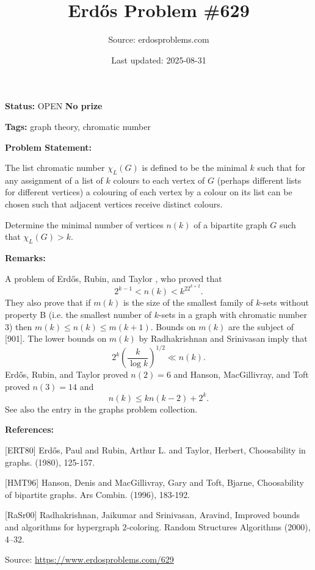 \documentclass{article}
\title{Erd\H{o}s Problem \#629}
\date{Last updated: 2025-08-31}
\author{Source: erdosproblems.com}
\begin{document}
\maketitle

\noindent\textbf{Status:} OPEN \quad \textbf{No prize}

\noindent\textbf{Tags:} graph theory, chromatic number

\medskip
\noindent\textbf{Problem Statement:}

The list chromatic number $\chi_L(G)$ is defined to be the minimal $k$ such that for any assignment of a list of $k$ colours to each vertex of $G$ (perhaps different lists for different vertices) a colouring of each vertex by a colour on its list can be chosen such that adjacent vertices receive distinct colours.

Determine the minimal number of vertices $n(k)$ of a bipartite graph $G$ such that $\chi_L(G)>k$.

\bigskip
\noindent\textbf{Remarks:}

A problem of Erd\H{o}s, Rubin, and Taylor \cite{ERT80}, who proved that\[2^{k-1}<n(k) <k^22^{k+2}.\]They also prove that if $m(k)$ is the size of the smallest family of $k$-sets without property B (i.e. the smallest number of $k$-sets in a graph with chromatic number $3$) then $m(k)\leq n(k)\leq m(k+1)$. Bounds on $m(k)$ are the subject of [901]. The lower bounds on $m(k)$ by Radhakrishnan and Srinivasan \cite{RaSr00} imply that\[2^k \left(\frac{k}{\log k}\right)^{1/2}\ll n(k).\]Erd\H{o}s, Rubin, and Taylor \cite{ERT80} proved $n(2)=6$ and Hanson, MacGillivray, and Toft \cite{HMT96} proved $n(3)=14$ and\[n(k) \leq kn(k-2)+2^k.\]See also the entry in the graphs problem collection.

\bigskip
\noindent\textbf{References:}

[ERT80] Erd\H{o}s, Paul and Rubin, Arthur L. and Taylor, Herbert, Choosability in graphs. (1980), 125-157.
 
 [HMT96] Hanson, Denis and MacGillivray, Gary and Toft, Bjarne, Choosability of bipartite graphs. Ars Combin. (1996), 183-192.
 
 [RaSr00] Radhakrishnan, Jaikumar and Srinivasan, Aravind, Improved bounds and algorithms for hypergraph {$2$}-coloring. Random Structures Algorithms (2000), 4--32.

\bigskip
\noindent\small{Source: \url{https://www.erdosproblems.com/629}}
\end{document}
